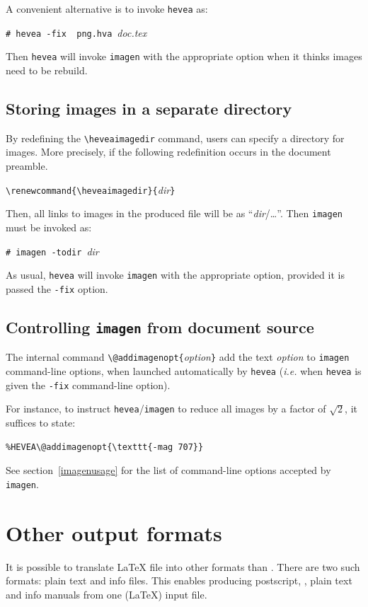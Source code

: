 A convenient alternative is to invoke \texttt{hevea} as:
\begin{flushleft}
\texttt{\#~hevea~-fix~~png.hva}~\textit{doc.tex}
\end{flushleft}
Then \texttt{hevea} will invoke \texttt{imagen} with the appropriate
option when it thinks images need to be rebuild.


\subsection{Storing images in a separate directory}
By redefining the \verb+\heveaimagedir+ command, users can specify a
directory for images.
More precisely, if the following redefinition occurs in the document
preamble.
\begin{flushleft}
\verb+\renewcommand{\heveaimagedir}{+\textit{dir}\verb+}+
\end{flushleft}
Then, all links to images in the produced \html{} file will be as
``\textit{dir}/\ldots''.
Then \texttt{imagen} must be invoked as:
\begin{flushleft}
\texttt{\#~imagen~-todir}~\textit{dir}~
\end{flushleft}
As usual, \texttt{hevea} will invoke \texttt{imagen} with the
appropriate option, provided it is passed the \texttt{-fix} option.


\subsection{Controlling\label{imagen-source} \texttt{imagen} from document source}
The internal command
\verb+\@addimagenopt{+\textit{option}\verb+}+ add
the text \textit{option} to \texttt{imagen} command-line options, when
launched automatically by \texttt{hevea} (\emph{i.e.} when
\texttt{hevea} is given the \texttt{-fix} command-line option).

For instance, to instruct \texttt{hevea}/\texttt{imagen} to
reduce all images by a factor of $\sqrt{2}$, it suffices to state:
\begin{flushleft}
\texttt{\%HEVEA}\verb+\@addimagenopt{\texttt{-mag 707}}+
\end{flushleft}
See section~\ref{imagenusage} for the list of command-line options
accepted by \texttt{imagen}.

\section{Other \label{alternative}output formats}
It is possible to translate \LaTeX{} file into other formats than
\html. There are two such formats: plain text and info files.
This enables producing postscript,
\html, plain text and info manuals from one (\LaTeX) input file.

